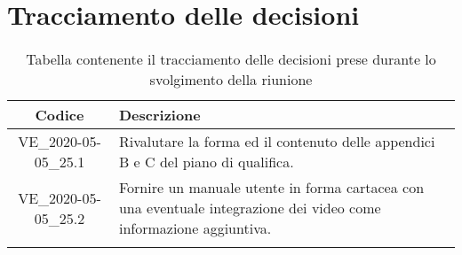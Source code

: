 \section*{Tracciamento delle decisioni}

\begin{center}
	\begin{longtable}{|c|p{12.25cm}|}
	\hline
	\rowcolor{lighter-grayer}
	\textbf{Codice} & \textbf{Descrizione} \\
	\hline
	\endfirsthead

	\hline
	VE\_2020-05-05\_25.1 & Rivalutare la forma ed il contenuto delle appendici B e C del piano di qualifica. \\
	\hline
	VE\_2020-05-05\_25.2 & Fornire un manuale utente in forma cartacea con una eventuale integrazione dei video come informazione aggiuntiva. \\
	\hline
	\caption{Tabella contenente il tracciamento delle decisioni prese durante lo svolgimento della riunione}
	\end{longtable}
\end{center}
